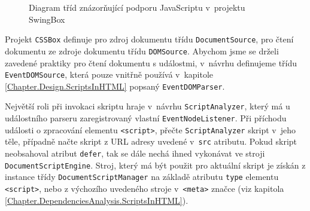\begin{figure}[H]
  \begin{center}
    \caption{Diagram tříd znázorňující podporu JavaScriptu v~projektu SwingBox}
    \label{Figure.ScriptsInSwingBoxDesign}
  \end{center}
\end{figure}

Projekt \texttt{CSSBox} definuje pro zdroj dokumentu třídu \texttt{DocumentSource}, pro čtení dokumentu ze zdroje dokumentu třídu \texttt{DOMSource}. Abychom jsme se drželi zavedené praktiky pro čtení dokumentu s událostmi, v~návrhu definujeme třídu \texttt{EventDOMSource}, která pouze vnitřně používá v~kapitole \ref{Chapter.Design.ScriptsInHTML} popsaný \texttt{EventDOMParser}. 

Největší roli při invokaci skriptu hraje v~návrhu \texttt{ScriptAnalyzer}, který má u událostního parseru zaregistrovaný vlastní \texttt{EventNodeListener}. Při příchodu události o zpracování elementu \texttt{<script>}, přečte \texttt{ScriptAnalyzer} skript v~jeho těle, případně načte skript z URL adresy uvedené v~\texttt{src} atributu. Pokud skript neobsahoval atribut \texttt{defer}, tak se dále nechá ihned vykonávat ve stroji \texttt{DocumentScriptEngine}. Stroj, který má být použit pro aktuální skript je získán z instance třídy \texttt{DocumentScriptManager} na základě atributu \texttt{type} elementu \texttt{<script>}, nebo z výchozího uvedeného stroje v~\texttt{<meta>} značce (viz kapitola \ref{Chapter.DependenciesAnalysis.ScriptsInHTML}).

